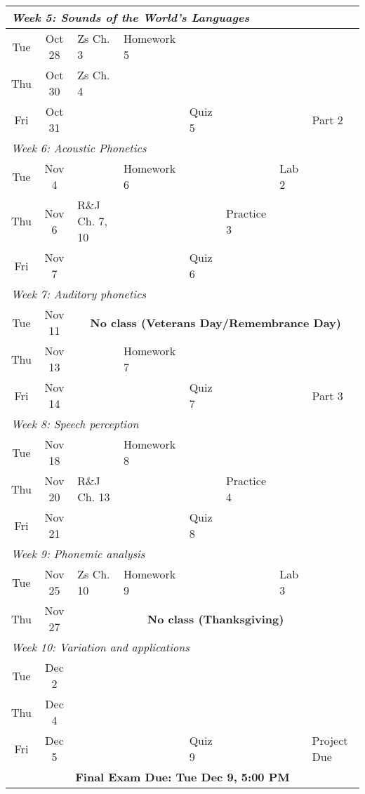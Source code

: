 \documentclass[12pt, letterpaper]{article}
\begin{document}
\begin{longtable}{|c|c|l|p{3cm}|p{1.25cm}|l|l|l|}
\multicolumn{8}{|l|}{\textit{Week 5: Sounds of the World's Languages}} \\ \hline
Tue & Oct 28  & Zs Ch. 3 & Homework 5 & & & & \\ \hline
Thu & Oct 30  & Zs Ch. 4 &  & & & & \\ \hline
Fri & Oct 31  & & & Quiz 5 & & & Part 2 \\ \hline

\multicolumn{8}{|l|}{\textit{Week 6: Acoustic Phonetics}} \\ \hline
Tue & Nov 4   &  & Homework 6 & & & Lab 2 & \\ \hline
Thu & Nov 6   & R\&J Ch. 7, 10 &  & & Practice 3 & & \\ \hline
Fri & Nov 7   & & & Quiz 6 & & & \\ \hline

\multicolumn{8}{|l|}{\textit{Week 7: Auditory phonetics}} \\ \hline
Tue & Nov 11  & \multicolumn{6}{c|}{\textbf{No class (Veterans Day/Remembrance Day)}} \\ \hline
Thu & Nov 13  &  & Homework 7 & & & & \\ \hline
Fri & Nov 14  & & & Quiz 7 & & & Part 3 \\ \hline

\multicolumn{8}{|l|}{\textit{Week 8: Speech perception}} \\ \hline
Tue & Nov 18  & & Homework 8 & & & & \\ \hline
Thu & Nov 20  & R\&J Ch. 13 & & & Practice 4 & & \\ \hline
Fri & Nov 21  & & & Quiz 8 & & & \\ \hline

\multicolumn{8}{|l|}{\textit{Week 9: Phonemic analysis }} \\ \hline
Tue & Nov 25  & Zs Ch. 10 & Homework 9 & & & Lab 3& \\ \hline
Thu & Nov 27  & \multicolumn{6}{c|}{\textbf{No class (Thanksgiving)}} \\ \hline

\multicolumn{8}{|l|}{\textit{Week 10: Variation and applications}} \\ \hline
Tue & Dec 2   &  & & & & & \\ \hline
Thu & Dec 4   & & & &  & & \\ \hline
Fri & Dec 5   & & & Quiz 9 & & & Project Due \\ \hline

\multicolumn{8}{|c|}{\textbf{Final Exam Due: Tue Dec 9, 5:00 PM}} \\ \hline
\end{longtable}



\end{document}
